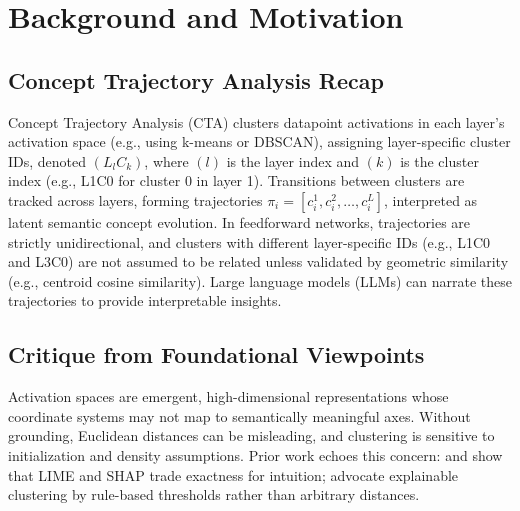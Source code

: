 \section{Background and Motivation}

\subsection{Concept Trajectory Analysis Recap}

Concept Trajectory Analysis (CTA) clusters datapoint activations in each layer's activation space (e.g., using k-means or DBSCAN), assigning layer-specific cluster IDs, denoted $(L_lC_k)$, where $(l)$ is the layer index and $(k)$ is the cluster index (e.g., L1C0 for cluster 0 in layer 1). Transitions between clusters are tracked across layers, forming trajectories $\pi_i = [c_i^1, c_i^2, \dots, c_i^L]$, interpreted as latent semantic concept evolution. In feedforward networks, trajectories are strictly unidirectional, and clusters with different layer-specific IDs (e.g., L1C0 and L3C0) are not assumed to be related unless validated by geometric similarity (e.g., centroid cosine similarity). Large language models (LLMs) can narrate these trajectories to provide interpretable insights.

\subsection{Critique from Foundational Viewpoints}

Activation spaces are emergent, high-dimensional representations whose coordinate systems may not map to semantically meaningful axes. Without grounding, Euclidean distances can be misleading, and clustering is sensitive to initialization and density assumptions. Prior work echoes this concern: \citet{ribeiro2016} and \citet{lundberg2017} show that LIME and SHAP trade exactness for intuition; \citet{dasgupta2020} advocate explainable clustering by rule-based thresholds rather than arbitrary distances.